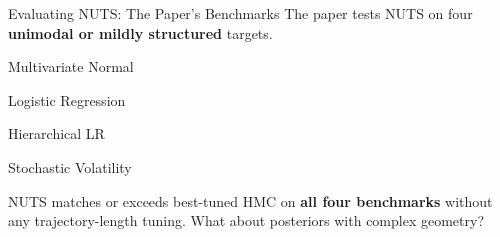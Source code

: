 \documentclass{beamer}
\begin{document}
\begin{frame}{Evaluating NUTS: The Paper's Benchmarks}
  \vspace{-0.2cm}
    The paper tests NUTS on four \textbf{unimodal or mildly structured} targets.

    \vspace{-0.05cm}
    \noindent
    \begin{minipage}[t]{0.22\textwidth}\centering
      \begin{tcolorbox}[stressbox, title=250-D, halign=center]
        \footnotesize Multivariate Normal
      \end{tcolorbox}
    \end{minipage}
    \hfill
    \begin{minipage}[t]{0.22\textwidth}\centering
      \begin{tcolorbox}[stressbox, title=25-D, halign=center]
        \footnotesize Logistic Regression
      \end{tcolorbox}
    \end{minipage}
    \hfill
    \begin{minipage}[t]{0.22\textwidth}\centering
      \begin{tcolorbox}[stressbox, title=302-D, halign=center]
        \footnotesize Hierarchical LR
      \end{tcolorbox}
    \end{minipage}
    \hfill
    \begin{minipage}[t]{0.22\textwidth}\centering
      \begin{tcolorbox}[stressbox, title=3001-D, halign=center]
        \footnotesize Stochastic Volatility
      \end{tcolorbox}
    \end{minipage}

    \vspace{-0.3cm}
    \begin{tcolorbox}[keybox]
      NUTS matches or exceeds best-tuned HMC on \textbf{all four benchmarks} without any trajectory-length tuning. What about posteriors with complex geometry?
    \end{tcolorbox}

      \small
  \vspace{-0.25cm}
  \begin{center}
  \begin{tikzpicture}[>=Stealth, font=\footnotesize]


\end{tikzpicture}
\end{center}
\end{frame}
\end{document}
